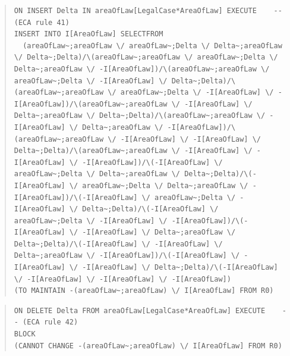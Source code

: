 \documentclass[10pt,a4paper]{report}              %
\theoremstyle{plain}\theorembodyfont{\rmfamily}\newtheorem{definition}{Definition}[section]
\theoremstyle{plain}\theorembodyfont{\rmfamily}\newtheorem{designrule}[definition]{Requirement}
\begin{document}
\begin{quote}
\begin{verbatim}
ON INSERT Delta IN areaOfLaw[LegalCase*AreaOfLaw] EXECUTE    -- (ECA rule 41)
INSERT INTO I[AreaOfLaw] SELECTFROM
  (areaOfLaw~;areaOfLaw \/ areaOfLaw~;Delta \/ Delta~;areaOfLaw \/ Delta~;Delta)/\(areaOfLaw~;areaOfLaw \/ areaOfLaw~;Delta \/ Delta~;areaOfLaw \/ -I[AreaOfLaw])/\(areaOfLaw~;areaOfLaw \/ areaOfLaw~;Delta \/ -I[AreaOfLaw] \/ Delta~;Delta)/\(areaOfLaw~;areaOfLaw \/ areaOfLaw~;Delta \/ -I[AreaOfLaw] \/ -I[AreaOfLaw])/\(areaOfLaw~;areaOfLaw \/ -I[AreaOfLaw] \/ Delta~;areaOfLaw \/ Delta~;Delta)/\(areaOfLaw~;areaOfLaw \/ -I[AreaOfLaw] \/ Delta~;areaOfLaw \/ -I[AreaOfLaw])/\(areaOfLaw~;areaOfLaw \/ -I[AreaOfLaw] \/ -I[AreaOfLaw] \/ Delta~;Delta)/\(areaOfLaw~;areaOfLaw \/ -I[AreaOfLaw] \/ -I[AreaOfLaw] \/ -I[AreaOfLaw])/\(-I[AreaOfLaw] \/ areaOfLaw~;Delta \/ Delta~;areaOfLaw \/ Delta~;Delta)/\(-I[AreaOfLaw] \/ areaOfLaw~;Delta \/ Delta~;areaOfLaw \/ -I[AreaOfLaw])/\(-I[AreaOfLaw] \/ areaOfLaw~;Delta \/ -I[AreaOfLaw] \/ Delta~;Delta)/\(-I[AreaOfLaw] \/ areaOfLaw~;Delta \/ -I[AreaOfLaw] \/ -I[AreaOfLaw])/\(-I[AreaOfLaw] \/ -I[AreaOfLaw] \/ Delta~;areaOfLaw \/ Delta~;Delta)/\(-I[AreaOfLaw] \/ -I[AreaOfLaw] \/ Delta~;areaOfLaw \/ -I[AreaOfLaw])/\(-I[AreaOfLaw] \/ -I[AreaOfLaw] \/ -I[AreaOfLaw] \/ Delta~;Delta)/\(-I[AreaOfLaw] \/ -I[AreaOfLaw] \/ -I[AreaOfLaw] \/ -I[AreaOfLaw])
(TO MAINTAIN -(areaOfLaw~;areaOfLaw) \/ I[AreaOfLaw] FROM R0)
\end{verbatim}
\end{quote}
\begin{quote}
\begin{verbatim}
ON DELETE Delta FROM areaOfLaw[LegalCase*AreaOfLaw] EXECUTE    -- (ECA rule 42)
BLOCK
(CANNOT CHANGE -(areaOfLaw~;areaOfLaw) \/ I[AreaOfLaw] FROM R0)
\end{verbatim}
\end{quote}
\end{document}
